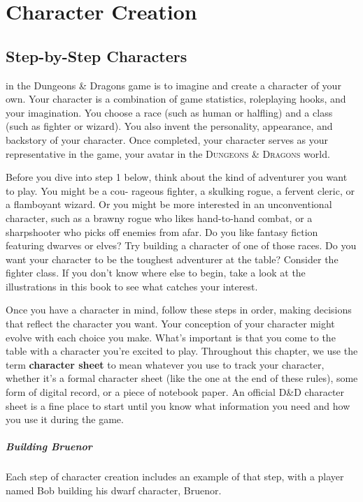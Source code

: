 \part{Character Creation}
\chapter{Step-by-Step Characters}
 in the Dungeons \& Dragons game is to imagine and create a character of your own. Your character is a combination of game statistics, roleplaying hooks, and your imagination. You choose a race (such as human or halfling) and a class (such as fighter or wizard). You also invent the personality, appearance, and backstory of your character. Once completed, your character serves as your representative in the game, your avatar in the \textsc{Dungeons \& Dragons} world.

Before you dive into step 1 below, think about the kind of adventurer you want to play. You might be a cou- rageous fighter, a skulking rogue, a fervent cleric, or a flamboyant wizard. Or you might be more interested in an unconventional character, such as a brawny rogue who likes hand-to-hand combat, or a sharpshooter who picks off enemies from afar. Do you like fantasy fiction featuring dwarves or elves? Try building a character of one of those races. Do you want your character to be the toughest adventurer at the table? Consider the fighter class. If you don’t know where else to begin, take a look at the illustrations in this book to see what catches your interest.

Once you have a character in mind, follow these steps in order, making decisions that reflect the character you want. Your conception of your character might evolve with each choice you make. What’s important is that you come to the table with a character you’re excited to play. Throughout this chapter, we use the term \textbf{character sheet} to mean whatever you use to track your character, whether it’s a formal character sheet (like the one at the end of these rules), some form of digital record, or a piece of notebook paper. An official D\&D character sheet is a fine place to start until you know what information you need and how you use it during the game.

\subsubsection{Building Bruenor}
Each step of character creation includes an example of that step, with a player named Bob building his dwarf character, Bruenor.

